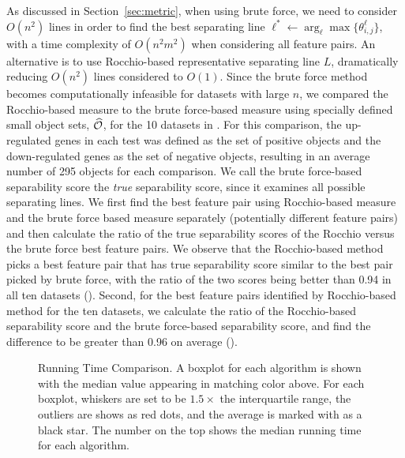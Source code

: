  As discussed in Section~\ref{sec:metric}, when using brute force, we need to consider $O(n^2)$ lines in order to find the best separating line $\ell^* \leftarrow \arg_\ell \max \{\theta_{i,j}^{\ell}\}$, with a time complexity of $O(n^2m^2)$ when considering all feature pairs. An alternative is to use Rocchio-based representative separating line $L$, dramatically reducing $O(n^2)$ lines considered to $O(1)$. Since the brute force method becomes computationally infeasible for datasets with large $n$, we compared the Rocchio-based measure to the brute force-based measure using
specially defined small object sets, $\widehat{{\mathcal{O}}}$, for the 10 datasets in \msig. For this comparison, the up-regulated genes in each \msig test was defined as the set of positive objects and the down-regulated genes as the set of negative objects, resulting in an average number of 295 objects for each comparison. We call the brute force-based separability score the {\em true} separability score, since it examines all possible separating lines. We first find the best feature pair using Rocchio-based measure and the brute force based measure separately (potentially different feature pairs) and then calculate the ratio of the true separability scores of the Rocchio versus the brute force best feature pairs. We observe that the Rocchio-based method picks a best feature pair that has true separability score similar to the best pair picked by brute force, with the ratio of the two scores being better than 0.94 in all ten datasets (\bruterocchioratio). Second, for the best feature pairs identified by Rocchio-based method for the ten datasets, we calculate the ratio of the Rocchio-based separability score and the brute force-based separability score, and find the difference to be greater than 0.96 on average (\bruterocchioscore).

\begin{figure}[h]
\vspace{-5mm}
\centering %
{}
\vspace{-5mm}
\caption{Running Time Comparison. A boxplot for each algorithm is shown with the median value appearing in matching color above. For each boxplot, whiskers are set to be $1.5\times$ the interquartile range, the outliers are shows as red dots, and the average is marked with as a black star. The number on the top shows the median running time for each algorithm.}
\vspace{-5mm}
\label{fig:time}
\end{figure}

